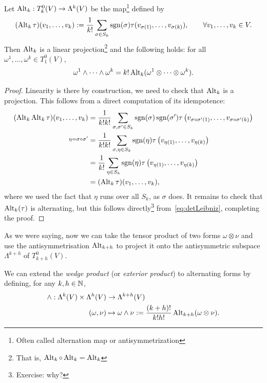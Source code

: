 \begin{proposition}
	Let $\operatorname{Alt}_k: T_k^0(V)\to \Lambda^k(V)$ be the map\footnote{Often called alternation map or antisymmetrization} defined by
	\begin{equation}
		(\operatorname{Alt}_k\tau)(v_1,\ldots,v_k) := \frac1{k!} \sum_{\sigma\in S_k} \operatorname{sgn}(\sigma) \tau(v_{\sigma(1)}, \ldots, v_{\sigma(k)}),
		\qquad \forall v_1,\ldots,v_k \in V.
	\end{equation}
	Then $\operatorname{Alt}_k$ is a linear projection\footnote{That is, $\operatorname{Alt}_k\circ\operatorname{Alt}_k = \operatorname{Alt}_k$} and the following holds:
	for all $\omega^1, \ldots, \omega^k \in T^0_1(V)$,
	\begin{equation}
		\omega^1 \wedge \cdots \wedge \omega^k = k! \operatorname{Alt}_k(\omega^1 \otimes \cdots \otimes \omega^k).
	\end{equation}
\end{proposition}
\begin{proof}
	Linearity is there by construction, we need to check that $\operatorname{Alt}_k$ is a projection.
	This follows from a direct computation of its idempotence:
	\begin{align}
		(\operatorname{Alt}_k \operatorname{Alt}_k \tau)(v_1,\ldots, v_k)
		 & = \frac1{k!k!}\sum_{\sigma,\sigma'\in S_k}\operatorname{sgn}(\sigma)\operatorname{sgn}(\sigma') \tau\left(v_{\sigma\circ\sigma'(1)}, \ldots, v_{\sigma\circ\sigma'(k)}\right) \\
		\overset{\eta = \sigma\circ\sigma'}{}
		 & =\frac1{k!k!}\sum_{\sigma,\eta\in S_k}\operatorname{sgn}(\eta) \tau\left(v_{\eta(1)}, \ldots, v_{\eta(k)}\right)                                                \\
		 & =\frac1{k!}\sum_{\eta\in S_k}\operatorname{sgn}(\eta) \tau\left(v_{\eta(1)}, \ldots, v_{\eta(k)}\right)                                                         \\
		 & =(\operatorname{Alt}_k \tau)(v_1,\ldots, v_k),
	\end{align}
	where we used the fact that $\eta$ runs over all $S_k$, as $\sigma$ does.
	It remains to check that $\operatorname{Alt}_k(\tau)$ is alternating, but this follows directly\footnote{Exercise: why?} from~\eqref{eq:detLeibniz}, completing the proof.
\end{proof}

As we were saying, now we can take the tensor product of two forms $\omega\otimes\nu$ and use the antisymmetrisation $\operatorname{Alt}_{k+h}$ to project it onto the antisymmetric subspace $\Lambda^{k+h}$ of $T_{k+h}^0(V)$.

\begin{definition}
	We can extend the \emph{wedge product} (or \emph{exterior product}) to alternating forms by defining, for any $k,h\in\mathbb{N}$,
	\begin{align}
		\wedge : \Lambda^k(V)\times\Lambda^h(V) & \to \Lambda^{k+h}(V)                                                         \\
		(\omega, \nu)                           & \mapsto \omega\wedge\nu := \frac{(k+h)!}{k!h!} \operatorname{Alt}_{k+h}(\omega\otimes\nu).
	\end{align}
\end{definition}

